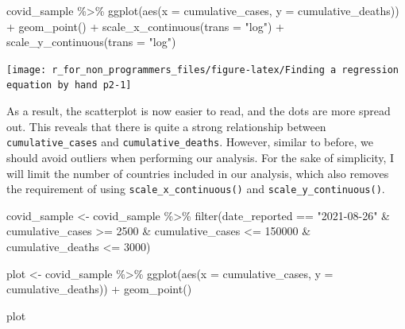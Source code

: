 \documentclass[
]{book}
\newenvironment{Shaded}{\begin{snugshade}}{\end{snugshade}}
\newcommand{\AttributeTok}[1]{\textcolor[rgb]{0.77,0.63,0.00}{#1}}
\newcommand{\DecValTok}[1]{\textcolor[rgb]{0.00,0.00,0.81}{#1}}
\newcommand{\FunctionTok}[1]{\textcolor[rgb]{0.00,0.00,0.00}{#1}}
\newcommand{\NormalTok}[1]{#1}
\newcommand{\OtherTok}[1]{\textcolor[rgb]{0.56,0.35,0.01}{#1}}
\newcommand{\SpecialCharTok}[1]{\textcolor[rgb]{0.00,0.00,0.00}{#1}}
\newcommand{\StringTok}[1]{\textcolor[rgb]{0.31,0.60,0.02}{#1}}
\begin{document}
\begin{Shaded}
\begin{Highlighting}[]
\NormalTok{covid\_sample }\SpecialCharTok{\%\textgreater{}\%}
  \FunctionTok{ggplot}\NormalTok{(}\FunctionTok{aes}\NormalTok{(}\AttributeTok{x =}\NormalTok{ cumulative\_cases,}
             \AttributeTok{y =}\NormalTok{ cumulative\_deaths)) }\SpecialCharTok{+}
  \FunctionTok{geom\_point}\NormalTok{() }\SpecialCharTok{+}
  \FunctionTok{scale\_x\_continuous}\NormalTok{(}\AttributeTok{trans =} \StringTok{"log"}\NormalTok{) }\SpecialCharTok{+}
  \FunctionTok{scale\_y\_continuous}\NormalTok{(}\AttributeTok{trans =} \StringTok{"log"}\NormalTok{)}
\end{Highlighting}
\end{Shaded}

\begin{center}\texttt{[image: r\_for\_non\_programmers\_files/figure-latex/Finding a regression equation by hand p2-1]} \end{center}

As a result, the scatterplot is now easier to read, and the dots are more spread out. This reveals that there is quite a strong relationship between \texttt{cumulative\_cases} and \texttt{cumulative\_deaths}. However, similar to before, we should avoid outliers when performing our analysis. For the sake of simplicity, I will limit the number of countries included in our analysis, which also removes the requirement of using \texttt{scale\_x\_continuous()} and \texttt{scale\_y\_continuous()}.

\begin{Shaded}
\begin{Highlighting}[]
\NormalTok{covid\_sample }\OtherTok{\textless{}{-}}\NormalTok{ covid\_sample }\SpecialCharTok{\%\textgreater{}\%}
  \FunctionTok{filter}\NormalTok{(date\_reported }\SpecialCharTok{==} \StringTok{"2021{-}08{-}26"} \SpecialCharTok{\&}
\NormalTok{           cumulative\_cases }\SpecialCharTok{\textgreater{}=} \DecValTok{2500} \SpecialCharTok{\&}
\NormalTok{           cumulative\_cases }\SpecialCharTok{\textless{}=} \DecValTok{150000} \SpecialCharTok{\&}
\NormalTok{           cumulative\_deaths }\SpecialCharTok{\textless{}=} \DecValTok{3000}\NormalTok{)}

\NormalTok{plot }\OtherTok{\textless{}{-}}\NormalTok{ covid\_sample }\SpecialCharTok{\%\textgreater{}\%}
  \FunctionTok{ggplot}\NormalTok{(}\FunctionTok{aes}\NormalTok{(}\AttributeTok{x =}\NormalTok{ cumulative\_cases,}
             \AttributeTok{y =}\NormalTok{ cumulative\_deaths)) }\SpecialCharTok{+}
  \FunctionTok{geom\_point}\NormalTok{()}

\NormalTok{plot}
\end{Highlighting}
\end{Shaded}
\end{document}
